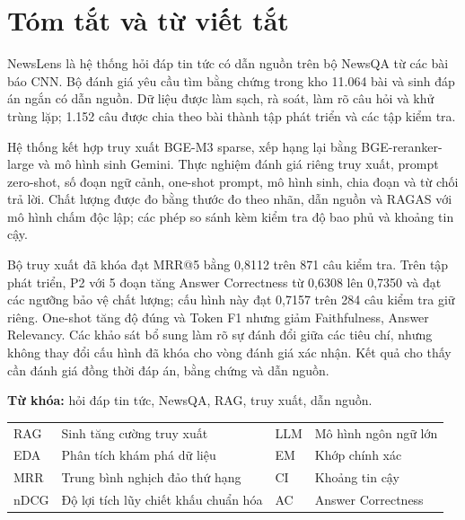 \section*{Tóm tắt và từ viết tắt}
NewsLens là hệ thống hỏi đáp tin tức có dẫn nguồn trên bộ NewsQA từ các bài báo CNN. Bộ đánh giá yêu cầu tìm bằng chứng trong kho 11.064 bài và sinh đáp án ngắn có dẫn nguồn. Dữ liệu được làm sạch, rà soát, làm rõ câu hỏi và khử trùng lặp; 1.152 câu được chia theo bài thành tập phát triển và các tập kiểm tra.

Hệ thống kết hợp truy xuất BGE-M3 sparse, xếp hạng lại bằng BGE-reranker-large và mô hình sinh Gemini. Thực nghiệm đánh giá riêng truy xuất, prompt zero-shot, số đoạn ngữ cảnh, one-shot prompt, mô hình sinh, chia đoạn và từ chối trả lời. Chất lượng được đo bằng thước đo theo nhãn, dẫn nguồn và RAGAS với mô hình chấm độc lập; các phép so sánh kèm kiểm tra độ bao phủ và khoảng tin cậy.

Bộ truy xuất đã khóa đạt MRR@5 bằng 0,8112 trên 871 câu kiểm tra. Trên tập phát triển, P2 với 5 đoạn tăng Answer Correctness từ 0,6308 lên 0,7350 và đạt các ngưỡng bảo vệ chất lượng; cấu hình này đạt 0,7157 trên 284 câu kiểm tra giữ riêng. One-shot tăng độ đúng và Token F1 nhưng giảm Faithfulness, Answer Relevancy. Các khảo sát bổ sung làm rõ sự đánh đổi giữa các tiêu chí, nhưng không thay đổi cấu hình đã khóa cho vòng đánh giá xác nhận. Kết quả cho thấy cần đánh giá đồng thời đáp án, bằng chứng và dẫn nguồn.

\noindent\textbf{Từ khóa:} hỏi đáp tin tức, NewsQA, RAG, truy xuất, dẫn nguồn.
\begin{center}\small
\begin{tabularx}{\linewidth}{@{}lY lY@{}}\toprule
RAG & Sinh tăng cường truy xuất & LLM & Mô hình ngôn ngữ lớn \\
EDA & Phân tích khám phá dữ liệu & EM & Khớp chính xác \\
MRR & Trung bình nghịch đảo thứ hạng & CI & Khoảng tin cậy \\
nDCG & Độ lợi tích lũy chiết khấu chuẩn hóa & AC & Answer Correctness \\
\bottomrule\end{tabularx}\end{center}
\clearpage
